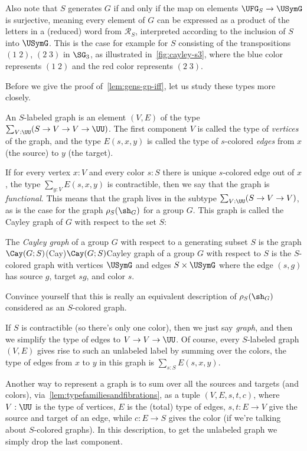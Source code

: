 Also note that $S$ generates $G$ if and only if the map on elements
$\UFG_S \to \USymG$ is surjective, meaning every element of $G$ can be expressed
as a product of the letters in a (reduced) word from $\mathcal R_S$, interpreted
according to the inclusion of $S$ into $\USymG$.
This is the case for example for $S$ consisting of the transpositions
$(1\;2)$, $(2\;3)$ in $\SG_3$, as illustrated in~\cref{fig:cayley-s3},
where the \textcolor{casblue}{blue} color represents $(1\;2)$
and the \textcolor{casred}{red} color represents $(2\;3)$.

Before we give the proof of~\cref{lem:gens-gp-iff}, let us study these types more closely.
\begin{definition}
  An $S$-labeled graph is an element $(V,E)$ of the type
  $\sum_{V:\UU}(S \to V \to V \to \UU)$.%
  The first component $V$ is called the type of \emph{vertices} of the graph,
  and the type $E(s,x,y)$ is called the type of $s$-colored \emph{edges}
  from $x$ (the source) to $y$ (the target).
\end{definition}
If for every vertex $x:V$ and every color $s:S$ there is unique $s$-colored edge out of $x$, \ie the type $\sum_{y:V}E(s,x,y)$ is contractible, then we say that the graph
is \emph{functional}. This means that the graph lives in the subtype $\sum_{V:\UU}(S \to V \to V)$,
as is the case for the graph $\rho_S(\sh_G)$ for a group $G$.
This graph is called the Cayley graph of $G$ with respect to the set $S$:
\begin{definition}\label{def:cayley-graph}
  The \emph{Cayley graph}
  of a group $G$ with respect to a generating subset $S$
  is the graph $\Cay(G;S)$\glossary(Cay){$\protect\Cay(G;S)$}{Cayley graph of a group $G$
  with respect to $S$}
  is the $S$-colored graph with vertices $\USymG$
  and edges $S \times \USymG$ where the edge $(s,g)$ has source $g$, target $sg$,
  and color $s$.
\end{definition}
Convince yourself that this is really an equivalent description of $\rho_S(\sh_G)$
considered as an $S$-colored graph.

If $S$ is contractible (so there's only one color), then we just say \emph{graph},
and then we simplify the type of edges to $V \to V \to \UU$.
Of course, every $S$-labeled graph $(V,E)$ gives rise to such an unlabeled label
by summing over the colors, \ie the type of edges from $x$ to $y$ in this graph
is $\sum_{s:S}E(s,x,y)$.

Another way to represent a graph is to sum over all the sources and targets (and colors),
via~\cref{lem:typefamiliesandfibrations},
\ie as a tuple $(V,E,s,t,c)$, where $V:\UU$ is the type of vertices,
$E$ is the (total) type of edges,
$s,t : E \to V$ give the source and target of an edge,
while $c: E \to S$ gives the color (if we're talking about $S$-colored graphs).
In this description, to get the unlabeled graph we simply drop the last component.

